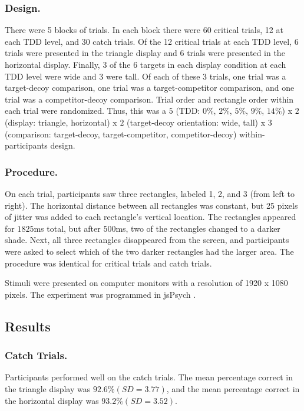 \subsubsection{Design.}
There were 5 blocks of trials. In each block there were 60 critical trials, 12 at each TDD level, and 30 catch trials. Of the 12 critical trials at each TDD level, 6 trials were presented in the triangle display and 6 trials were presented in the horizontal display. Finally, 3 of the 6 targets in each display condition at each TDD level were wide and 3 were tall. Of each of these 3 trials, one trial was a target-decoy comparison, one trial was a target-competitor comparison, and one trial was a competitor-decoy comparison. Trial order and rectangle order within each trial were randomized. Thus, this was a $5$ (TDD: $0\%$, $2\%$, $5\%$, $9\%$, $14\%$) x $2$ (display: triangle, horizontal) x $2$ (target-decoy orientation: wide, tall) x $3$ (comparison: target-decoy, target-competitor, competitor-decoy) within-participants design. 

\subsubsection{Procedure.}

On each trial, participants saw three rectangles, labeled 1, 2, and 3 (from left to right). The horizontal distance between all rectangles was constant, but 25 pixels of jitter was added to each rectangle's vertical location. The rectangles appeared for $1825$ms total, but after $500$ms, two of the rectangles changed to a darker shade. Next, all three rectangles disappeared from the screen, and participants were asked to select which of the two darker rectangles had the larger area. The procedure was identical for critical trials and catch trials.

Stimuli were presented on computer monitors with a resolution of 1920 x 1080 pixels. The experiment was programmed in jsPsych \parencite{deleeuwJsPsychJavaScriptLibrary2015}. 

\subsection{Results}

\subsubsection{Catch Trials.}
Participants performed well on the catch trials. The mean percentage correct in the triangle display was $92.6\% (SD=3.77)$, and the mean percentage correct in the horizontal display was $93.2\% (SD=3.52)$. 

